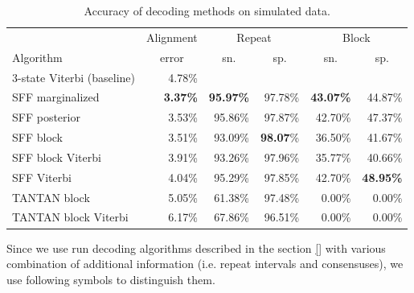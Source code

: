 \def\M{$^\circ$} %
\def\MM{$^{\circ\circ\circ}$} %
\def\D{$^{\circ\circ}$} %
\def\DD{$^{\dagger}$} %
\def\R{$^{\yen}$}
\def\RR{$^{\yen\yen}$}
\def\CC#1{\multicolumn{1}{c}{#1}} %
\def\S{$^{\star}$}

\begin{table}
\begin{center}
\begin{tabular}{lr@{\quad}rr@{\quad}rr}
\hline
          & \CC{Alignment} & \multicolumn{2}{c}{Repeat} & 
\multicolumn{2}{c}{Block}\\
Algorithm & \CC{error} & \CC{sn.} & \CC{sp.} & \CC{sn.} & \CC{sp.} \\
\hline
\hline
3-state Viterbi (baseline)    & 4.78\% \\
\hline
SFF marginalized    & {\bf 3.37\%} & {\bf 95.97\%} & 97.78\% & {\bf 43.07\%} & 44.87\%\\
SFF posterior       & 3.53\% & 95.86\% & 97.87\% & 42.70\% & 47.37\%\\
SFF block           & 3.51\% & 93.09\% & {\bf 98.07}\% & 36.50\% & 41.67\%\\
SFF block Viterbi   & 3.91\% & 93.26\% & 97.96\% & 35.77\% & 40.66\%\\
SFF Viterbi         & 4.04\% & 95.29\% & 97.85\% & 42.70\% & {\bf 48.95\%}\\
TANTAN block        & 5.05\% & 61.38\% & 97.48\% & 0.00\% & 0.00\%\\
TANTAN block Viterbi& 6.17\% & 67.86\% & 96.51\% & 0.00\% & 0.00\%\\
\hline
\end{tabular}
\end{center}
\caption{Accuracy of decoding methods on simulated data.}\label{TABLE:SFFMAIN}
\end{table}

Since we use run decoding algorithms described in the section \ref{} with various 
combination of additional information (i.e. repeat intervals and consensuses), we
use following symbols to distinguish them.

